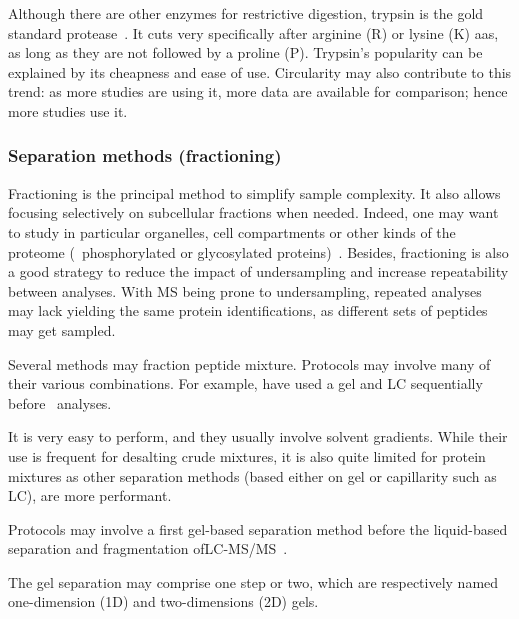 Although there are other enzymes for restrictive digestion,
trypsin is the gold standard protease~.
It cuts very specifically after arginine (R) or lysine (K) \glspl{aa},
as long as they are not followed by a proline (P).
Trypsin's popularity can be explained by its cheapness and ease of use.
Circularity may also contribute to this trend:
as more studies are using it, more data are available for comparison;
hence more studies use it.\mybr\

\subsubsection{Separation methods (fractioning)}\label{subsub:sepMethods}
Fractioning is the principal method to simplify sample complexity. It also allows
focusing selectively on subcellular fractions when needed. Indeed, one may want
to study in particular organelles, cell compartments or other kinds of the proteome
(\eg\ phosphorylated or glycosylated proteins)~. Besides,
fractioning is also a good strategy to reduce the impact of undersampling and
increase repeatability between analyses.
With \gls{MS} being prone to undersampling,
repeated analyses may lack yielding the same
protein identifications,
as different sets of peptides may get sampled.\mybr\

Several methods may fraction peptide mixture.
Protocols may involve many of their various combinations.
For example, \citet{PandeyData,KusterData}
have used a gel and \gls{LC} sequentially before \ms\ analyses.\mybr\

It is very easy to perform, and they usually involve solvent gradients. While
their use is frequent for desalting crude mixtures, it is also quite limited
for protein mixtures as other separation methods (based either on gel or
capillarity such as \gls{LC}), are more performant.\mybr\

Protocols may involve a first gel-based separation method before the
liquid-based separation and fragmentation of\enspace\gls{LC-MS/MS}~.\mybr\

The gel separation may comprise one step or two, which are respectively named
one-dimension (1D) and two-dimensions (2D) gels.\mybr\

